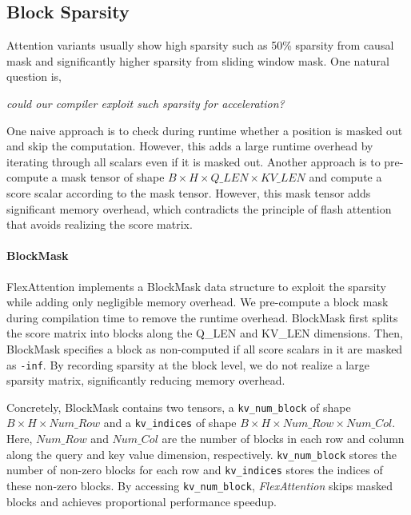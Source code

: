\subsection{Block Sparsity}
\label{sec:block_sparsity}



Attention variants usually show high sparsity such as 50\% sparsity from causal mask and significantly higher sparsity from sliding window mask.
One natural question is, 

\textit{could our compiler exploit such sparsity for acceleration?}

One naive approach is to check during runtime whether a position is masked out and skip the computation.
However, this adds a large runtime overhead by iterating through all scalars even if it is masked out.
Another approach is to pre-compute a mask tensor of shape $B\times H\times Q\_LEN \times KV\_LEN$ and compute a score scalar according to the mask tensor.
However, this mask tensor adds significant memory overhead, which contradicts the principle of flash attention that avoids realizing the score matrix.



\paragraph{BlockMask}
FlexAttention implements a BlockMask data structure to exploit the sparsity while adding only negligible memory overhead.
We pre-compute a block mask during compilation time to remove the runtime overhead.
BlockMask first splits the score matrix into blocks along the Q\_LEN and KV\_LEN dimensions.
Then, BlockMask specifies a block as non-computed if all score scalars in it are masked as {\tt -inf}.
By recording sparsity at the block level, we do not realize a large sparsity matrix, significantly reducing memory overhead.

Concretely, BlockMask contains two tensors, a \texttt{kv\_num\_block} of shape $B\times H \times Num\_Row$ and a \texttt{kv\_indices} of shape $B\times H \times Num\_Row \times Num\_Col$.
Here, $Num\_Row$ and $Num\_Col$ are the number of blocks in each row and column along the query and key value dimension, respectively.
\texttt{kv\_num\_block} stores the number of non-zero blocks for each row and \texttt{kv\_indices} stores the indices of these non-zero blocks.
By accessing \texttt{kv\_num\_block}, \textit{FlexAttention} skips masked blocks and achieves proportional performance speedup.



